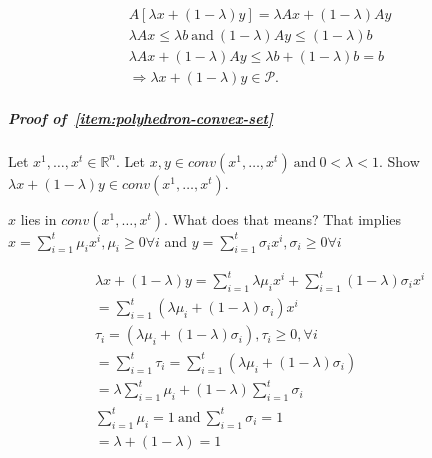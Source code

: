 \documentclass[main]{subfiles}
\begin{document}
\begin{gather*}
A [\lambda x + (1-\lambda)y ] = \lambda Ax + (1-\lambda)Ay \\
 \lambda Ax \leq \lambda b \  \text{and}\  (1-\lambda)Ay \leq (1-\lambda) b \\
 \lambda Ax + (1-\lambda)Ay \leq \lambda b + (1-\lambda) b = b \\
 \Rightarrow \lambda x + (1-\lambda)y \in \mathcal{P}.
\end{gather*}

\subparagraph{Proof of~\ref{item:polyhedron-convex-set}}
Let $x^{1}, \dots, x^{t} \in \mathbb{R}^{n}$. Let $x,y \in conv(x^{1}, \dots,
x^{t})\ \text{and} \ 0 < \lambda < 1$. Show $\lambda x + (1-\lambda)y \in
conv(x^{1}, \dots, x^{t})$.

$x$ lies in $conv(x^{1}, \dots, x^{t})$. What does that means? That implies
$x = \sum_{i=1}^{t} \mu_{i} x^{i}, \mu_{i} \geq 0 \forall i$ and 
$y = \sum_{i=1}^{t} \sigma_{i} x^{i}, \sigma_{i} \geq 0 \forall i$

\begin{gather*}
\lambda x + (1-\lambda)y = \sum_{i=1}^{t} \lambda \mu_{i} x^{i} +
\sum_{i=1}^{t} (1-\lambda) \sigma_{i} x^{i} \\
= \sum_{i=1}^{t} (\lambda \mu_{i} + (1-\lambda) \sigma_{i}) x^{i} \\
\tau_{i} = (\lambda \mu_{i} + (1-\lambda) \sigma_{i}), \tau_{i} \geq 0, \forall i \\
= \sum_{i=1}^{t} \tau_{i} = \sum_{i=1}^{t} (\lambda \mu_{i} + (1-\lambda) \sigma_{i}) \\
= \lambda \sum_{i=1}^{t} \mu_{i} + (1-\lambda) \sum_{i=1}^{t} \sigma_{i} \\
\sum_{i=1}^{t} \mu_{i} = 1 \ \text{and} \ \sum_{i=1}^{t} \sigma_{i} = 1 \\
= \lambda + (1-\lambda) = 1
\end{gather*}
\end{document}
